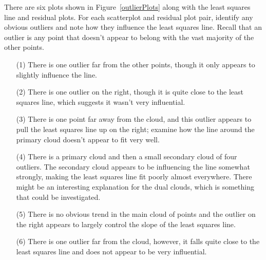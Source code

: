 \begin{examplewrap}
\begin{nexample}{There are six plots shown in Figure~\ref{outlierPlots} along with the least squares line and residual plots. For each scatterplot and residual plot pair, identify any obvious outliers and note how they influence the least squares line. Recall that an outlier is any point that doesn't appear to belong with the vast majority of the other points.}\label{outlierPlotsExample}
\begin{itemize}
\setlength{\itemsep}{0mm}
\item[(1)] There is one outlier far from the other points, though it only appears to slightly influence the line.
\item[(2)] There is one outlier on the right, though it is quite close to the least squares line, which suggests it wasn't very influential.
\item[(3)] There is one point far away from the cloud, and this outlier appears to pull the least squares line up on the right; examine how the line around the primary cloud doesn't appear to fit very well.
\item[(4)] There is a primary cloud and then a small secondary cloud of four outliers. The secondary cloud appears to be influencing the line somewhat strongly, making the least squares line fit poorly almost everywhere. There might be an interesting explanation for the dual clouds, which is something that could be investigated.
\item[(5)] There is no obvious trend in the main cloud of points and the outlier on the right appears to largely control the slope of the least squares line.
\item[(6)] There is one outlier far from the cloud, however, it falls quite close to the least squares line and does not appear to be very influential.
\end{itemize}
\end{nexample}
\end{examplewrap}

